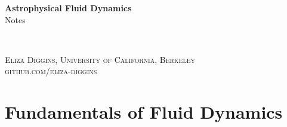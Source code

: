 \documentclass[11pt,fleqn]{book} %
\begin{document}

\begingroup
\thispagestyle{empty}
\centering
\vspace*{5cm}
\par\normalfont\fontsize{35}{35}\sffamily\selectfont
\textbf{Astrophysical Fluid Dynamics}\\

\vspace*{1cm}
{\Huge Notes}\par %
\endgroup


\newpage
~\vfill
\thispagestyle{empty}


\noindent \textsc{Eliza Diggins, University of California, Berkeley}\\

\noindent \textsc{github.com/eliza-diggins}\\ %




\pagestyle{empty} %

\tableofcontents %


\pagestyle{fancy} %

\part{Fundamentals of Fluid Dynamics}
\end{document}
